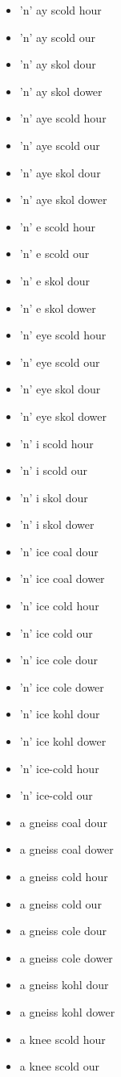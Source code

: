 \begin{itemize}
\item 'n' ay scold hour
\item 'n' ay scold our
\item 'n' ay skol dour
\item 'n' ay skol dower
\item 'n' aye scold hour
\item 'n' aye scold our
\item 'n' aye skol dour
\item 'n' aye skol dower
\item 'n' e scold hour
\item 'n' e scold our
\item 'n' e skol dour
\item 'n' e skol dower
\item 'n' eye scold hour
\item 'n' eye scold our
\item 'n' eye skol dour
\item 'n' eye skol dower
\item 'n' i scold hour
\item 'n' i scold our
\item 'n' i skol dour
\item 'n' i skol dower
\item 'n' ice coal dour
\item 'n' ice coal dower
\item 'n' ice cold hour
\item 'n' ice cold our
\item 'n' ice cole dour
\item 'n' ice cole dower
\item 'n' ice kohl dour
\item 'n' ice kohl dower
\item 'n' ice-cold hour
\item 'n' ice-cold our
\item a gneiss coal dour
\item a gneiss coal dower
\item a gneiss cold hour
\item a gneiss cold our
\item a gneiss cole dour
\item a gneiss cole dower
\item a gneiss kohl dour
\item a gneiss kohl dower
\item a knee scold hour
\item a knee scold our

\end{itemize}
